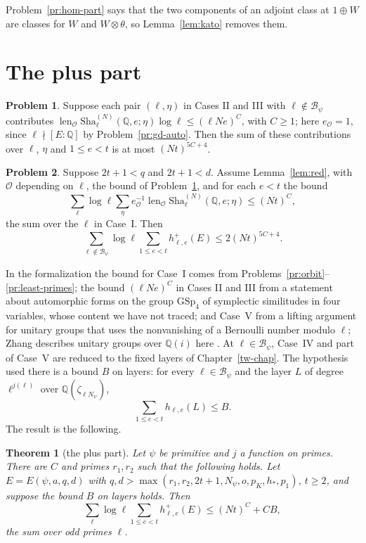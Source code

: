 \documentclass[reqno]{amsart}
\newcounter{chap}
\theoremstyle{definition}
\newtheorem{problem}{Problem}[section]
\theoremstyle{plain}
\newtheorem{theorem}{Theorem}[section]
\theoremstyle{remark}
\newcommand{\Q}{\mathbb{Q}}
\newcommand{\Oc}{\mathcal{O}}
\newcommand{\Bc}{\mathcal{B}}
\newcommand{\len}{\operatorname{len}}
\newcommand{\Sha}{\mathrm{Sha}}
\begin{document}
Problem~\ref{pr:hom-part} says that the two components of an adjoint class at \(1\oplus W\) are classes for \(W\) and \(W\otimes\theta\), so Lemma~\ref{lem:kato} removes them.

\section{The plus part}\label{sec:assembly}

\begin{problem}\label{pr:small-ell}
Suppose each pair \((\ell,\eta)\) in Cases II and III with \(\ell\notin\Bc_\psi\) contributes \(\len_\Oc\Sha^{(N)}_\ell(\Q,e;\eta)\log\ell\le(\ell Ne)^C\), with \(C\ge1\); here \(e_\Oc=1\), since \(\ell\nmid[E:\Q]\) by Problem~\ref{pr:gd-auto}.  Then the sum of these contributions over \(\ell\), \(\eta\) and \(1\le e<t\) is at most \((Nt)^{5C+4}\).
\end{problem}

\begin{problem}\label{pr:outside}
Suppose \(2t+1<q\) and \(2t+1<d\).  Assume Lemma~\ref{lem:red}, with \(\Oc\) depending on \(\ell\), the bound of Problem~\ref{pr:small-ell}, and for each \(e<t\) the bound
\[
 \sum_\ell\log\ell\sum_\eta e_\Oc^{-1}\len_\Oc\Sha^{(N)}_\ell(\Q,e;\eta)\le(Nt)^C,
\]
the sum over the \(\ell\) in Case~I.  Then
\[
 \sum_{\ell\notin\Bc_\psi}\log\ell\sum_{1\le e<t}h^+_{\ell,e}(E)\le2(Nt)^{5C+4}.
\]
\end{problem}

In the formalization the bound for Case~I comes from Problems~\ref{pr:orbit}--\ref{pr:least-primes}; the bound \((\ell Ne)^C\) in Cases II and III from a statement about automorphic forms on the group \(\mathrm{GSp}_4\) of symplectic similitudes in four variables, whose content we have not traced; and Case~V from a lifting argument for unitary groups that uses the nonvanishing of a Bernoulli number modulo \(\ell\); Zhang describes unitary groups over \(\Q(i)\) here \cite[\S5.4]{Zh}.  At \(\ell\in\Bc_\psi\), Case~IV and part of Case~V are reduced to the fixed layers of Chapter~\ref{tw-chap}.  The hypothesis used there is a bound \(B\) on layers: for every \(\ell\in\Bc_\psi\) and the layer \(L\) of degree \(\ell^{j(\ell)}\) over \(\Q(\zeta_{\ell N_\psi})\),
\[
 \sum_{1\le e<t}h_{\ell,e}(L)\le B.
\]
The result is the following.

\begin{theorem}[the plus part]\label{thm:plus}
Let \(\psi\) be primitive and \(j\) a function on primes.  There are \(C\) and primes \(r_1,r_2\) such that the following holds.  Let \(E=E(\psi,a,q,d)\) with \(q,d>\max(r_1,r_2,2t+1,N_\psi,o,p_K,h_*,p_1)\), \(t\ge2\), and suppose the bound \(B\) on layers holds.  Then
\[
 \sum_\ell\log\ell\sum_{1\le e<t}h^+_{\ell,e}(E)\le(Nt)^C+CB,
\]
the sum over odd primes \(\ell\).
\end{theorem}
\end{document}
